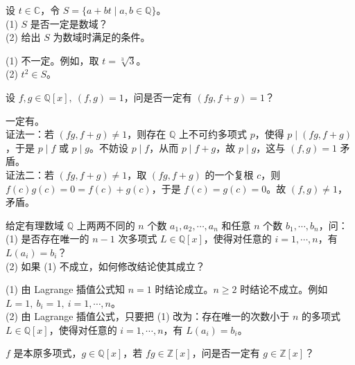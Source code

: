 \documentclass[lang=cn,12pt]{elegantbook}
\begin{document}
\begin{example}
    设 \( t \in \mathbb{C} \)，令 \( S = \{a + bt \mid a, b \in \mathbb{Q} \} \)。\\
    (1) \( S \) 是否一定是数域？\\
    (2) 给出 \( S \) 为数域时满足的条件。
\end{example} 
\begin{solution}
    (1) 不一定。例如，取 \( t = \sqrt[3]{3} \)。\\
    (2) \( t^2 \in S \)。
\end{solution} 

\begin{example}
    设 \( f, g \in \mathbb{Q}[x],\ (f, g) = 1 \)，问是否一定有 \( (fg, f + g) = 1 \)？
\end{example}
\begin{solution}
    一定有。\\
    证法一：若 \( (fg, f + g) \neq 1 \)，则存在 \( \mathbb{Q} \) 上不可约多项式 \( p \)，使得 \( p \mid (fg, f + g) \)，于是 \( p \mid f \) 或 \( p \mid g \)。不妨设 \( p \mid f \)，从而 \( p \mid f + g \)，故 \( p \mid g \)，这与 \( (f, g) = 1 \) 矛盾。\\
    证法二：若 \( (fg, f + g) \neq 1 \)，取 \( (fg, f + g) \) 的一个复根 \( c \)，则 \( f(c)g(c) = 0 = f(c) + g(c) \)，于是 \( f(c) = g(c) = 0 \)。故 \( (f, g) \neq 1 \)，矛盾。
\end{solution} 

\begin{example}
    给定有理数域 \( \mathbb{Q} \) 上两两不同的 \( n \) 个数 \( a_1, a_2, \cdots, a_n \) 和任意 \( n \) 个数 \( b_1, \cdots, b_n \)，问：\\
    (1) 是否存在唯一的 \( n-1 \) 次多项式 \( L \in \mathbb{Q}[x] \)，使得对任意的 \( i = 1, \cdots, n \)，有 \( L(a_i) = b_i \)？\\
    (2) 如果 (1) 不成立，如何修改结论使其成立？
\end{example}

\begin{solution}
    (1) 由 Lagrange 插值公式知 \( n = 1 \) 时结论成立。\( n \geq 2 \) 时结论不成立。例如 \( L = 1,\ b_i = 1,\ i = 1, \cdots, n \)。\\
    (2) 由 Lagrange 插值公式，只要把 (1) 改为：存在唯一的次数小于 \( n \) 的多项式 \( L \in \mathbb{Q}[x] \)，使得对任意的 \( i = 1, \cdots, n \)，有 \( L(a_i) = b_i \)。
\end{solution}

\begin{example}
    \( f \) 是本原多项式，\( g \in \mathbb{Q}[x] \)，若 \( fg \in \mathbb{Z}[x] \)，问是否一定有 \( g \in \mathbb{Z}[x] \)？
\end{example}
\end{document}
